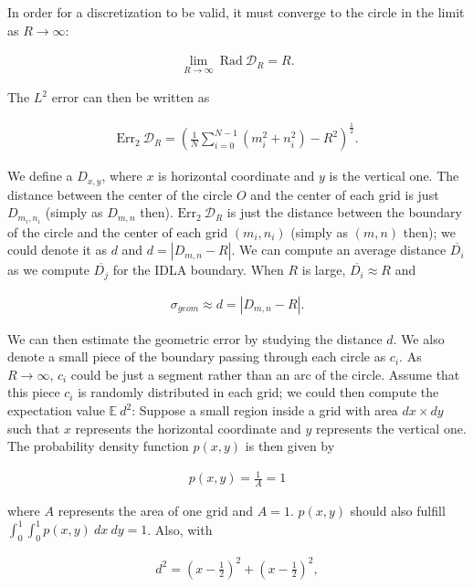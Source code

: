 \documentclass[letterpaper]{article}
\numberwithin{equation}{section} %
\numberwithin{figure}{section} %
\numberwithin{table}{section} %
\begin{document}
\noindent
In order for a discretization to be valid, it must converge to the circle in the limit as $R \rightarrow \infty$: 

\begin{align} 
\lim_{R \rightarrow \infty} \ \text{Rad} \ \mathcal{D}_R = R.
\end{align}

\noindent
The $L^2$ error can then be written as 

\begin{align} 
\text{Err}_2 \ \mathcal{D}_R=(\frac{1}{N} \sum_{i=0}^{N-1} (m_i^2+n_i^2)-R^2)^{\frac{1}{2}}.
\end{align}


We define a $D_{x,y}$, where $x$ is horizontal coordinate and $y$ is the vertical one. The distance between the center of the circle $O$ and the center of each grid is just $D_{m_i,n_i}$ (simply as $D_{m,n}$ then). $\text{Err}_2 \ \mathcal{D}_R$ is just the distance between the boundary of the circle and the center of each grid $(m_i,n_i)$ (simply as $(m,n)$ then); we could denote it as $d$ and $d=|D_{m,n}-R|$. We can compute an average distance $\overline{D_i}$ as we compute $\overline{D_j}$ for the IDLA boundary. When $R$ is large, $\overline{D_i} \approx R$ and 

\begin{align}
\sigma_{geom} \approx d = |D_{m,n}-R|. 
\end{align}


We can then estimate the geometric error by studying the distance $d$. We also denote a small piece of the boundary passing through each circle as $c_i$. As $R \rightarrow \infty$, $c_i$ could be just a segment rather than an arc of the circle. Assume that this piece $c_i$ is randomly distributed in each grid; we could then compute the expectation value $\mathbb{E}\ d^2$: Suppose a small region inside a grid with area $dx \times dy$ such that $x$ represents the horizontal coordinate and $y$ represents the vertical one. The probability density function $p(x,y)$ is then given by

\begin{align} 
p(x,y)=\frac{1}{A}=1
\end{align}

\noindent
where $A$ represents the area of one grid and $A=1$. $p(x,y)$ should also fulfill $\int_{0}^{1}\int_{0}^{1}p(x,y) \ dx \ dy=1$. Also, with 

\begin{align} 
d^2=(x-\frac{1}{2})^2+(x-\frac{1}{2})^2,
\end{align}
\end{document}
